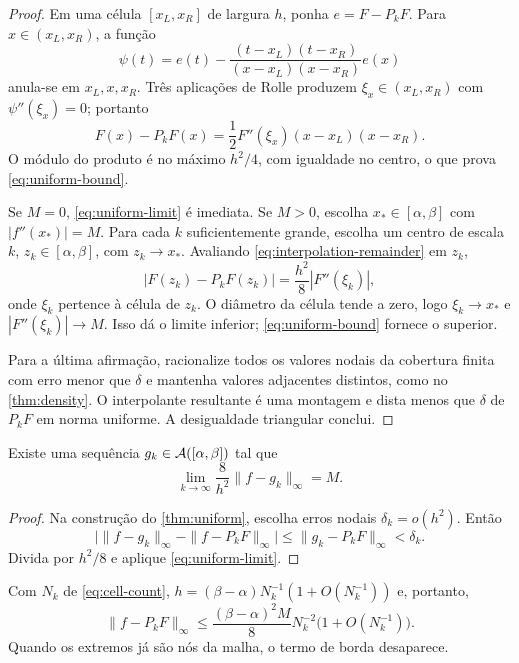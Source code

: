 \begin{proof}
Em uma célula $[x_L,x_R]$ de largura $h$, ponha $e=F-P_kF$. Para $x\in(x_L,x_R)$, a função
\[
 \psi(t)=e(t)-\frac{(t-x_L)(t-x_R)}{(x-x_L)(x-x_R)}e(x)
\]
anula-se em $x_L,x,x_R$. Três aplicações de Rolle produzem $\xi_x\in(x_L,x_R)$ com $\psi''(\xi_x)=0$; portanto
\begin{equation}
 F(x)-P_kF(x)=\frac12F''(\xi_x)(x-x_L)(x-x_R).
 \label{eq:interpolation-remainder}
\end{equation}
O módulo do produto é no máximo $h^2/4$, com igualdade no centro, o que prova \eqref{eq:uniform-bound}.

Se $M=0$, \eqref{eq:uniform-limit} é imediata. Se $M>0$, escolha $x_*\in[\alpha,\beta]$ com $|f''(x_*)|=M$. Para cada $k$ suficientemente grande, escolha um centro de escala $k$, $z_k\in[\alpha,\beta]$, com $z_k\to x_*$. Avaliando \eqref{eq:interpolation-remainder} em $z_k$,
\[
 |F(z_k)-P_kF(z_k)|=\frac{h^2}{8}|F''(\xi_k)|,
\]
onde $\xi_k$ pertence à célula de $z_k$. O diâmetro da célula tende a zero, logo $\xi_k\to x_*$ e $|F''(\xi_k)|\to M$. Isso dá o limite inferior; \eqref{eq:uniform-bound} fornece o superior.

Para a última afirmação, racionalize todos os valores nodais da cobertura finita com erro menor que $\delta$ e mantenha valores adjacentes distintos, como no \cref{thm:density}. O interpolante resultante é uma montagem e dista menos que $\delta$ de $P_kF$ em norma uniforme. A desigualdade triangular conclui.
\end{proof}

\begin{corollary}\label{cor:rational-sharp}
Existe uma sequência $g_k\in\mathcal{A}([\alpha,\beta])$ tal que
\[
 \lim_{k\to\infty}\frac{8}{h^2}\|f-g_k\|_\infty=M.
\]
\end{corollary}

\begin{proof}
Na construção do \cref{thm:uniform}, escolha erros nodais $\delta_k=o(h^2)$. Então
\[
 \bigl|\|f-g_k\|_\infty-\|f-P_kF\|_\infty\bigr|
 \le\|g_k-P_kF\|_\infty<\delta_k.
\]
Divida por $h^2/8$ e aplique \eqref{eq:uniform-limit}.
\end{proof}

Com $N_k$ de \eqref{eq:cell-count}, $h=(\beta-\alpha)N_k^{-1}(1+O(N_k^{-1}))$ e, portanto,
\begin{equation}
 \|f-P_kF\|_\infty
 \le \frac{(\beta-\alpha)^2M}{8}N_k^{-2}\bigl(1+O(N_k^{-1})\bigr).
 \label{eq:n-rate}
\end{equation}
Quando os extremos já são nós da malha, o termo de borda desaparece.


